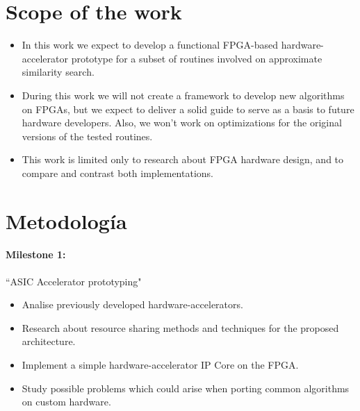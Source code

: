 \documentclass[11pt,letterpaper]{article}
\begin{document}
\section{Scope of the work}
\begin{itemize}
\item In this work we expect to develop a functional FPGA-based hardware-accelerator prototype for a subset of routines involved on approximate similarity search.
\item During this work we will not create a framework to develop new algorithms on FPGAs, but we expect to deliver a solid guide to serve as a basis to future hardware developers. Also, we won't work on optimizations for the original versions of the tested routines.
\item This work is limited only to research about FPGA hardware design, and to compare and contrast both implementations.
\end{itemize}



\section{Metodología}


\paragraph{Milestone 1:} ``ASIC Accelerator prototyping"
\begin{itemize}
\item Analise previously developed hardware-accelerators.
\item Research about resource sharing methods and techniques for the proposed architecture.
\item Implement a simple hardware-accelerator IP Core on the FPGA.
\item Study possible problems which could arise when porting common algorithms on custom hardware.
\end{itemize}
\end{document}
